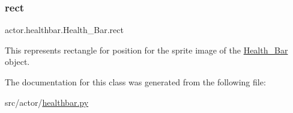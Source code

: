 \mbox{\label{classactor_1_1healthbar_1_1_health___bar_add2392af674af1341a9bef3d18640e83}} 
\subsubsection{\texorpdfstring{rect}{rect}}
{\footnotesize\ttfamily actor.\+healthbar.\+Health\+\_\+\+Bar.\+rect}



This represents rectangle for position for the sprite image of the \hyperlink{classactor_1_1healthbar_1_1_health___bar}{Health\+\_\+\+Bar} object. 



The documentation for this class was generated from the following file\+:\begin{DoxyCompactItemize}
\item 
src/actor/\hyperlink{healthbar_8py}{healthbar.\+py}\end{DoxyCompactItemize}

